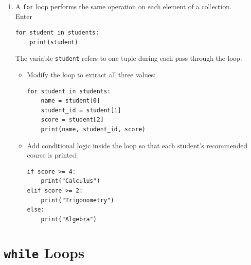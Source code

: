 \documentclass{article}
\begin{document}
\begin{enumerate}

\item A \texttt{for} loop performs the same operation on
each element of a collection.  Enter

\begin{verbatim}
for student in students:
    print(student)
\end{verbatim}

The variable \texttt{student} refers to one tuple during
each pass through the loop.

\begin{itemize}

\item Modify the loop to extract all three values:

\begin{verbatim}
for student in students:
    name = student[0]
    student_id = student[1]
    score = student[2]
    print(name, student_id, score)
\end{verbatim}

\item Add conditional logic inside the loop so that each
student's recommended course is printed:

\begin{verbatim}
if score >= 4:
    print("Calculus")
elif score >= 2:
    print("Trigonometry")
else:
    print("Algebra")
\end{verbatim}

\end{itemize}

\end{enumerate}


\section{\texttt{while} Loops}
\end{document}
